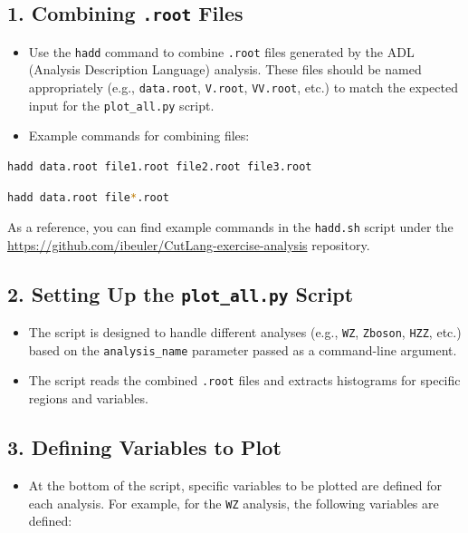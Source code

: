 \documentclass{article}
\begin{document}
\subsection*{1. Combining \texttt{.root} Files}
\begin{itemize}
    \item Use the \texttt{hadd} command to combine \texttt{.root} files generated by the ADL (Analysis Description Language) analysis. These files should be named appropriately (e.g., \texttt{data.root}, \texttt{V.root}, \texttt{VV.root}, etc.) to match the expected input for the \texttt{plot\_all.py} script.
    \item Example commands for combining files:
\end{itemize}

\begin{lstlisting}[language=bash]
hadd data.root file1.root file2.root file3.root
\end{lstlisting}

\begin{lstlisting}[language=bash]
hadd data.root file*.root
\end{lstlisting}

As a reference, you can find example commands in the \texttt{hadd.sh} script under the \url{https://github.com/ibeuler/CutLang-exercise-analysis} repository.

\subsection*{2. Setting Up the \texttt{plot\_all.py} Script}
\begin{itemize}
    \item The script is designed to handle different analyses (e.g., \texttt{WZ}, \texttt{Zboson}, \texttt{HZZ}, etc.) based on the \texttt{analysis\_name} parameter passed as a command-line argument.
    \item The script reads the combined \texttt{.root} files and extracts histograms for specific regions and variables.
\end{itemize}

\subsection*{3. Defining Variables to Plot}
\begin{itemize}
    \item At the bottom of the script, specific variables to be plotted are defined for each analysis. For example, for the \texttt{WZ} analysis, the following variables are defined:
\end{itemize}
\end{document}
